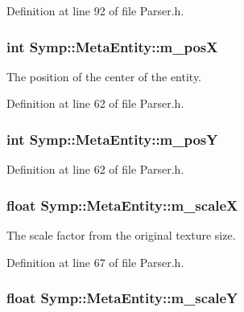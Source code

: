 Definition at line 92 of file Parser.\-h.

\hypertarget{struct_symp_1_1_meta_entity_ae0682dbb5d1c67db0fcb0196d60682cb}{
\subsubsection[{m\-\_\-pos\-X}]{\setlength{\rightskip}{0pt plus 5cm}int Symp\-::\-Meta\-Entity\-::m\-\_\-pos\-X}}\label{struct_symp_1_1_meta_entity_ae0682dbb5d1c67db0fcb0196d60682cb}
The position of the center of the entity. 

Definition at line 62 of file Parser.\-h.

\hypertarget{struct_symp_1_1_meta_entity_aca5081bf5b50d62fb653ca7a93b94649}{
\subsubsection[{m\-\_\-pos\-Y}]{\setlength{\rightskip}{0pt plus 5cm}int Symp\-::\-Meta\-Entity\-::m\-\_\-pos\-Y}}\label{struct_symp_1_1_meta_entity_aca5081bf5b50d62fb653ca7a93b94649}


Definition at line 62 of file Parser.\-h.

\hypertarget{struct_symp_1_1_meta_entity_aebe645a90fb39fd1abefa16335a504eb}{
\subsubsection[{m\-\_\-scale\-X}]{\setlength{\rightskip}{0pt plus 5cm}float Symp\-::\-Meta\-Entity\-::m\-\_\-scale\-X}}\label{struct_symp_1_1_meta_entity_aebe645a90fb39fd1abefa16335a504eb}
The scale factor from the original texture size. 

Definition at line 67 of file Parser.\-h.

\hypertarget{struct_symp_1_1_meta_entity_a7df7f1627cf970035c9f5b6490264094}{
\subsubsection[{m\-\_\-scale\-Y}]{\setlength{\rightskip}{0pt plus 5cm}float Symp\-::\-Meta\-Entity\-::m\-\_\-scale\-Y}}\label{struct_symp_1_1_meta_entity_a7df7f1627cf970035c9f5b6490264094}


